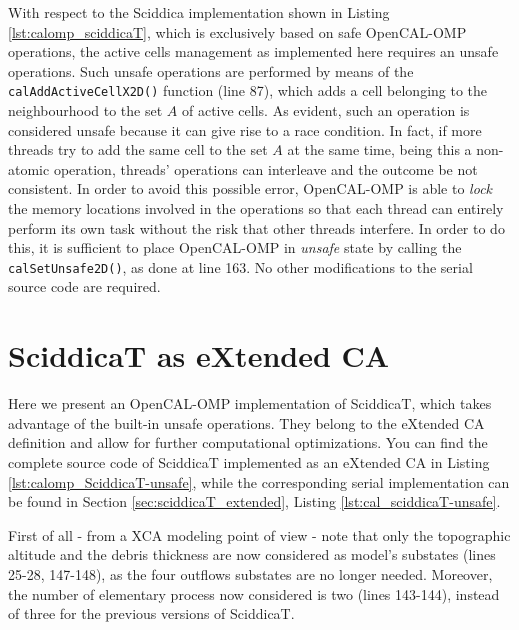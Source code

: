 

With respect to the Sciddica implementation shown in Listing
\ref{lst:calomp_sciddicaT}, which is exclusively based on safe
OpenCAL-OMP operations, the active cells management as implemented
here requires an unsafe operations. Such unsafe operations are
performed by means of the \verb'calAddActiveCellX2D()' function (line
87), which adds a cell belonging to the neighbourhood to the set $A$
of active cells. As evident, such an operation is considered unsafe
because it can give rise to a race condition. In fact, if more threads
try to add the same cell to the set $A$ at the same time, being this a
non-atomic operation, threads' operations can interleave and the
outcome be not consistent. In order to avoid this possible error, OpenCAL-OMP
is able to \emph{lock} the memory locations involved in the operations
so that each thread can entirely perform its own task without the risk
that other threads interfere. In order to do this, it is sufficient to
place OpenCAL-OMP in \emph{unsafe} state by calling the
\verb'calSetUnsafe2D()', as done at line 163. No other modifications
to the serial source code are required.

\section{SciddicaT as eXtended CA}
Here we present an OpenCAL-OMP implementation of SciddicaT, which takes
advantage of the built-in unsafe operations. They belong to the
eXtended CA definition and allow for further computational
optimizations. You can find the complete source code of SciddicaT
implemented as an eXtended CA in Listing
\ref{lst:calomp_SciddicaT-unsafe}, while the corresponding serial
implementation can be found in Section \ref{sec:sciddicaT_extended},
Listing \ref{lst:cal_sciddicaT-unsafe}.



First of all - from a XCA modeling point of view - note that only the
topographic altitude and the debris thickness are now considered as
model's substates (lines 25-28, 147-148), as the four outflows
substates are no longer needed. Moreover, the number of elementary
process now considered is two (lines 143-144), instead of three for
the previous versions of SciddicaT.

